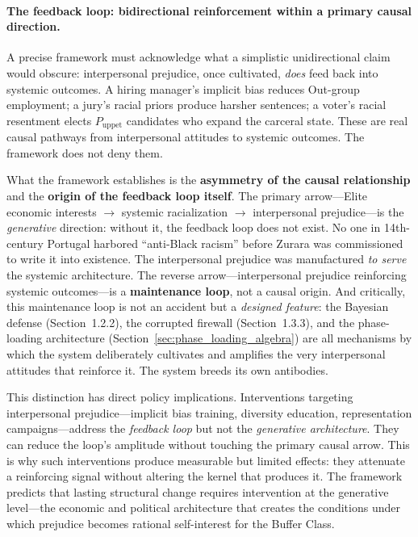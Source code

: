 \documentclass[12pt,openany]{book}
\begin{document}
\paragraph{The feedback loop: bidirectional reinforcement within a primary causal direction.}
A precise framework must acknowledge what a simplistic unidirectional claim would obscure: interpersonal prejudice, once cultivated, \textit{does} feed back into systemic outcomes. A hiring manager's implicit bias reduces Out-group employment; a jury's racial priors produce harsher sentences; a voter's racial resentment elects $P_{\text{uppet}}$ candidates who expand the carceral state. These are real causal pathways from interpersonal attitudes to systemic outcomes. The framework does not deny them.

What the framework establishes is the \textbf{asymmetry of the causal relationship} and the \textbf{origin of the feedback loop itself}. The primary arrow---Elite economic interests $\rightarrow$ systemic racialization $\rightarrow$ interpersonal prejudice---is the \textit{generative} direction: without it, the feedback loop does not exist. No one in 14th-century Portugal harbored ``anti-Black racism'' before Zurara was commissioned to write it into existence. The interpersonal prejudice was manufactured \textit{to serve} the systemic architecture. The reverse arrow---interpersonal prejudice reinforcing systemic outcomes---is a \textbf{maintenance loop}, not a causal origin. And critically, this maintenance loop is not an accident but a \textit{designed feature}: the Bayesian defense (Section~1.2.2), the corrupted firewall (Section~1.3.3), and the phase-loading architecture (Section~\ref{sec:phase_loading_algebra}) are all mechanisms by which the system deliberately cultivates and amplifies the very interpersonal attitudes that reinforce it. The system breeds its own antibodies.

This distinction has direct policy implications. Interventions targeting interpersonal prejudice---implicit bias training, diversity education, representation campaigns---address the \textit{feedback loop} but not the \textit{generative architecture}. They can reduce the loop's amplitude without touching the primary causal arrow. This is why such interventions produce measurable but limited effects: they attenuate a reinforcing signal without altering the kernel that produces it. The framework predicts that lasting structural change requires intervention at the generative level---the economic and political architecture that creates the conditions under which prejudice becomes rational self-interest for the Buffer Class.
\end{document}

